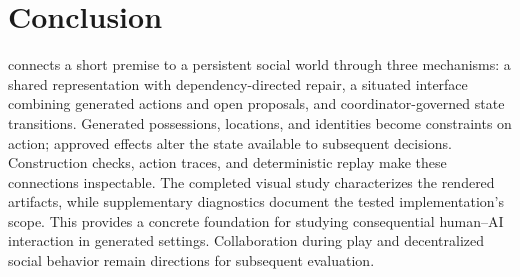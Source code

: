 \section{Conclusion}
\agora connects a short premise to a persistent social world through three
mechanisms: a shared representation with dependency-directed repair, a
situated interface combining generated actions and open proposals, and
coordinator-governed state transitions. Generated possessions, locations,
and identities become constraints on action; approved effects alter the
state available to subsequent decisions. Construction checks, action traces,
and deterministic replay make these connections inspectable. The completed
visual study characterizes the rendered artifacts, while supplementary
diagnostics document the tested implementation's scope. This provides a
concrete foundation for studying consequential human--AI interaction in
generated settings. Collaboration during play and decentralized social
behavior remain directions for subsequent evaluation.

